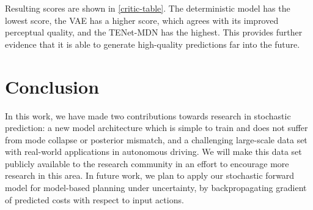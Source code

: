 \documentclass{article}
\begin{document}
Resulting scores are shown in \cref{critic-table}.
The deterministic model has the lowest score, the VAE has a higher score, which agrees with its improved perceptual quality, and the TENet-MDN has the highest.
This provides further evidence that it is able to generate high-quality predictions far into the future.

\section{Conclusion}

In this work, we have made two contributions towards research in stochastic prediction: a new model architecture which is simple to train and does not suffer from mode collapse or posterior mismatch, and a challenging large-scale data set with real-world applications in autonomous driving.
We will make this data set publicly available to the research community in an effort to encourage more research in this area.
In future work, we plan to apply our stochastic forward model for model-based planning under uncertainty, by backpropagating gradient of predicted costs with respect to input actions.

%
%
%
%
%
%
\end{document}
